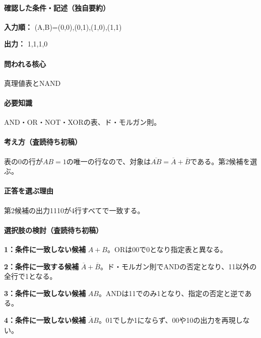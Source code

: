 \paragraph{確認した条件・記述（独自要約）}\mbox{}\par

\noindent\textbf{入力順：} (A,B)=\allowbreak{}(0,0),(0,1),(1,0),(1,1)\par

\noindent\textbf{出力：} 1,1,1,0\par

\paragraph{問われる核心} 真理値表とNAND

\paragraph{必要知識} AND・OR・NOT・XORの表、ド・モルガン則。

\paragraph{考え方（査読待ち初稿）} 表の0の行が\(AB=1\)の唯一の行なので、対象は\(\overline{AB}=\overline A+\overline B\)である。第2候補を選ぶ。

\paragraph{正答を選ぶ理由} 第2候補の出力1110が4行すべてで一致する。

\paragraph{選択肢の検討（査読待ち初稿）}\mbox{}\par

\noindent\textbf{1：条件に一致しない候補} \(A+B\)。ORは00で0となり指定表と異なる。\par

\noindent\textbf{2：条件に一致する候補} \(\overline A+\overline B\)。ド・モルガン則でANDの否定となり、11以外の全行で1となる。\par

\noindent\textbf{3：条件に一致しない候補} \(AB\)。ANDは11でのみ1となり、指定の否定と逆である。\par

\noindent\textbf{4：条件に一致しない候補} \(\overline A B\)。01でしか1にならず、00や10の出力を再現しない。\par

